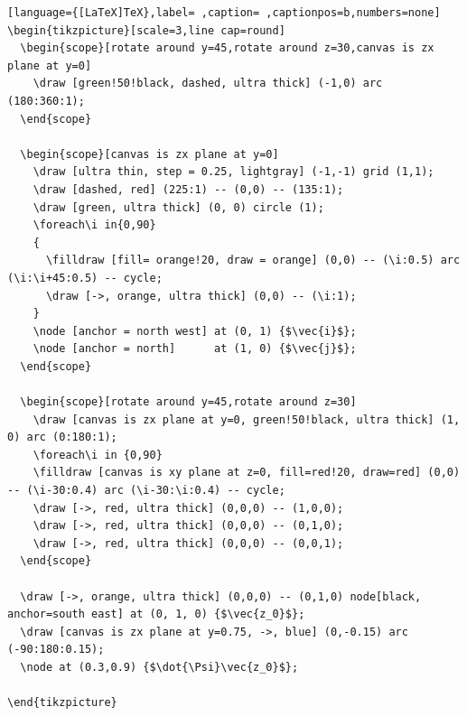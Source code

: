 \documentclass[a4paper,12pt]{article}
\begin{document}
\begin{lstlisting}[language={[LaTeX]TeX},label= ,caption= ,captionpos=b,numbers=none]
\begin{tikzpicture}[scale=3,line cap=round]
  \begin{scope}[rotate around y=45,rotate around z=30,canvas is zx plane at y=0]
    \draw [green!50!black, dashed, ultra thick] (-1,0) arc (180:360:1);
  \end{scope}

  \begin{scope}[canvas is zx plane at y=0]
    \draw [ultra thin, step = 0.25, lightgray] (-1,-1) grid (1,1);
    \draw [dashed, red] (225:1) -- (0,0) -- (135:1);
    \draw [green, ultra thick] (0, 0) circle (1);
    \foreach\i in{0,90}
    {
      \filldraw [fill= orange!20, draw = orange] (0,0) -- (\i:0.5) arc (\i:\i+45:0.5) -- cycle;
      \draw [->, orange, ultra thick] (0,0) -- (\i:1);
    }
    \node [anchor = north west] at (0, 1) {$\vec{i}$};
    \node [anchor = north]      at (1, 0) {$\vec{j}$};
  \end{scope}

  \begin{scope}[rotate around y=45,rotate around z=30]
    \draw [canvas is zx plane at y=0, green!50!black, ultra thick] (1, 0) arc (0:180:1);
    \foreach\i in {0,90}
    \filldraw [canvas is xy plane at z=0, fill=red!20, draw=red] (0,0) -- (\i-30:0.4) arc (\i-30:\i:0.4) -- cycle;
    \draw [->, red, ultra thick] (0,0,0) -- (1,0,0);
    \draw [->, red, ultra thick] (0,0,0) -- (0,1,0);
    \draw [->, red, ultra thick] (0,0,0) -- (0,0,1);
  \end{scope}

  \draw [->, orange, ultra thick] (0,0,0) -- (0,1,0) node[black, anchor=south east] at (0, 1, 0) {$\vec{z_0}$};
  \draw [canvas is zx plane at y=0.75, ->, blue] (0,-0.15) arc (-90:180:0.15);
  \node at (0.3,0.9) {$\dot{\Psi}\vec{z_0}$};

\end{tikzpicture}
\end{lstlisting}

\\[0pt]
\end{document}
